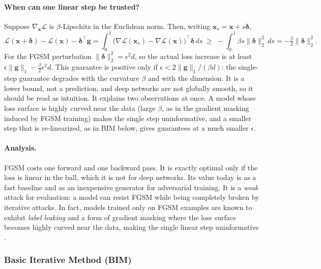 \documentclass[10pt,a4paper]{extarticle}
\theoremstyle{definition}
\newcommand{\Loss}{\mathcal{L}}
\newcommand{\x}{\mathbf{x}}
\newcommand{\bdelta}{\boldsymbol{\delta}}
\begin{document}
\paragraph{When can one linear step be trusted?} Suppose \(\nabla_{\x}\Loss\) is \(\beta\)-Lipschitz in the Euclidean norm. Then, writing \(\x_s=\x+s\bdelta\),
\[
\Loss(\x+\bdelta)-\Loss(\x)-\bdelta^\top\mathbf{g}=\int_0^1\big(\nabla\Loss(\x_s)-\nabla\Loss(\x)\big)^\top\bdelta\,ds\;\ge\;-\int_0^1\beta s\|\bdelta\|_2^2\,ds=-\tfrac{\beta}{2}\|\bdelta\|_2^2 .
\]
For the FGSM perturbation \(\|\bdelta\|_2^2=\epsilon^2d\), so the actual loss increase is at least \(\epsilon\|\mathbf{g}\|_1-\tfrac{\beta}{2}\epsilon^2d\). This guarantee is positive only if \(\epsilon<2\|\mathbf{g}\|_1/(\beta d)\): the single-step guarantee degrades with the curvature \(\beta\) and with the dimension. It is a lower bound, not a prediction, and deep networks are not globally smooth, so it should be read as intuition. It explains two observations at once. A model whose loss surface is highly curved near the data (large \(\beta\), as in the gradient masking induced by FGSM training) makes the single step uninformative, and a smaller step that is re-linearized, as in BIM below, gives guarantees at a much smaller \(\epsilon\).

\paragraph{Analysis.} FGSM costs one forward and one backward pass. It is exactly optimal only if the loss is linear in the ball, which it is not for deep networks. Its value today is as a fast baseline and as an inexpensive generator for adversarial training. It is a \emph{weak} attack for evaluation: a model can resist FGSM while being completely broken by iterative attacks. In fact, models trained only on FGSM examples are known to exhibit \emph{label leaking} and a form of gradient masking where the loss surface becomes highly curved near the data, making the single linear step uninformative \citep{tramer2018ensemble}.

\subsubsection{Basic Iterative Method (BIM)}
\end{document}
